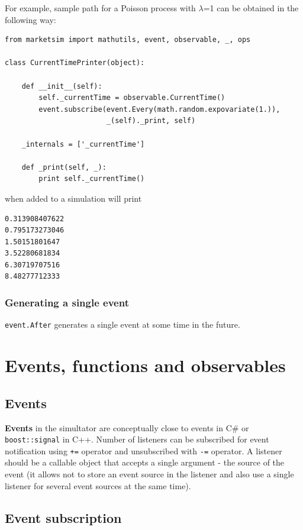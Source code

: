 \documentclass[a4paper,11pt]{article}
\begin{document}
For example, sample path for a Poisson process with $\lambda$=1 can be obtained
in the following way:

\begin{verbatim}
from marketsim import mathutils, event, observable, _, ops

class CurrentTimePrinter(object):

    def __init__(self):
        self._currentTime = observable.CurrentTime()
        event.subscribe(event.Every(math.random.expovariate(1.)),
                        _(self)._print, self)

    _internals = ['_currentTime']

    def _print(self, _):
        print self._currentTime()
\end{verbatim}

when added to a simulation will print

\begin{verbatim}
0.313908407622
0.795173273046
1.50151801647
3.52280681834
6.30719707516
8.48277712333
\end{verbatim}

\subsubsection{Generating a single
event}\label{generating-a-single-event}

\texttt{event.After} generates a single event at some time in the
future.

\section{Events, functions and
observables}\label{events-functions-and-observables}

\subsection{Events}\label{events}
\textbf{Events} in the simultator are conceptually close to events in
C\# or \texttt{boost::signal} in C++. Number of listeners can be
subscribed for event notification using \texttt{+=} operator and
unsubscribed with \texttt{-=} operator. A listener should be a callable
object that accepts a single argument - the source of the event (it
allows not to store an event source in the listener and also use a
single listener for several event sources at the same time).

\subsection{Event subscription}\label{event-subscription}
\end{document}
